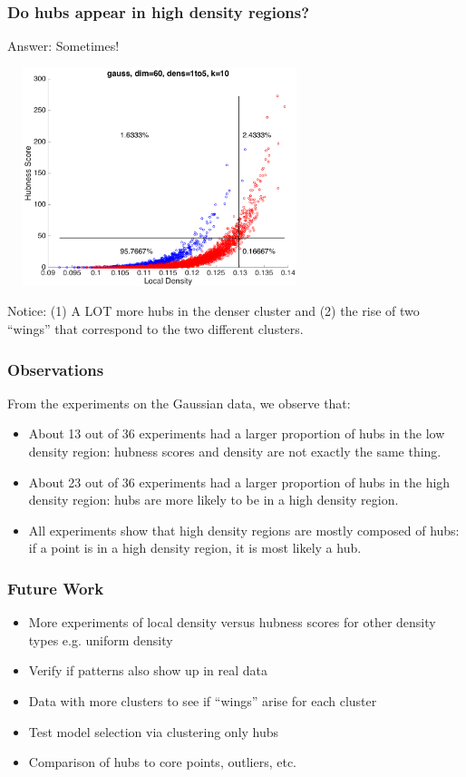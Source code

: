 \documentclass{beamer}
\begin{document}
\begin{frame}
\frametitle{Do hubs appear in high density regions?}

{\small Answer: Sometimes!}

\smallskip

\centering
\includegraphics[width=3.5in,height=2.5in]{./fig/gauss-dim60-1000to5000-k10-DensHub.png}

\smallskip

{\small Notice: (1) A LOT more hubs in the denser cluster and (2) the rise of two ``wings'' that correspond to the two different clusters.}
\end{frame}

\begin{frame}
\frametitle{Observations}

From the experiments on the Gaussian data, we observe that:

\begin{itemize}
\item About 13 out of 36 experiments had a larger proportion of hubs in the low density region: hubness scores and density are not exactly the same thing.
\item About 23 out of 36 experiments had a larger proportion of hubs in the high density region: hubs are more likely to be in a high density region.
\item All experiments show that high density regions are mostly composed of hubs:
if a point is in a high density region, it is most likely a hub.
\end{itemize}

\end{frame}

\begin{frame}
\frametitle{Future Work}

\begin{itemize}
\item More experiments of local density versus hubness scores for other density types e.g. uniform density
\item Verify if patterns also show up in real data
\item Data with more clusters to see if ``wings'' arise for each cluster
\item Test model selection via clustering only hubs
\item Comparison of hubs to core points, outliers, etc. 
\end{itemize}

\end{frame}

\end{document}
